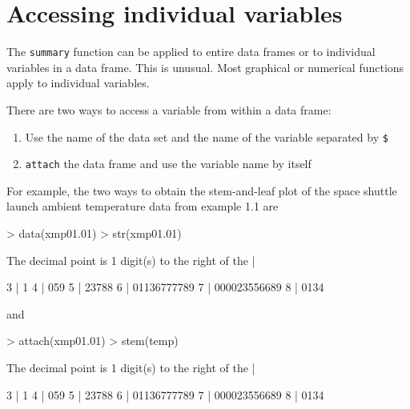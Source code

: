 \documentclass{book}
\begin{document}
\section{Accessing individual variables}
\label{sec:accessing}

The \texttt{summary} function can be applied to entire data frames or
to individual variables in a data frame.  This is unusual.
Most graphical or numerical functions apply to individual
variables.

There are two ways to access a variable from within a data frame:
\begin{enumerate}
\item Use the name of the data set and the name of the variable
separated by \texttt{\$}
\item \texttt{attach} the data frame and use the variable name by
itself
\end{enumerate}

For example, the two ways to obtain the stem-and-leaf plot of the
space shuttle launch ambient temperature data from example 1.1 are
\begin{Schunk}
\begin{Sinput}
> data(xmp01.01)
> str(xmp01.01)
\end{Sinput}
\begin{Soutput}
  The decimal point is 1 digit(s) to the right of the |

  3 | 1
  4 | 059
  5 | 23788
  6 | 01136777789
  7 | 000023556689
  8 | 0134
\end{Soutput}
\end{Schunk}
and
\begin{Schunk}
\begin{Sinput}
> attach(xmp01.01)
> stem(temp)
\end{Sinput}
\begin{Soutput}
  The decimal point is 1 digit(s) to the right of the |

  3 | 1
  4 | 059
  5 | 23788
  6 | 01136777789
  7 | 000023556689
  8 | 0134
\end{Soutput}
\end{Schunk}
\end{document}
